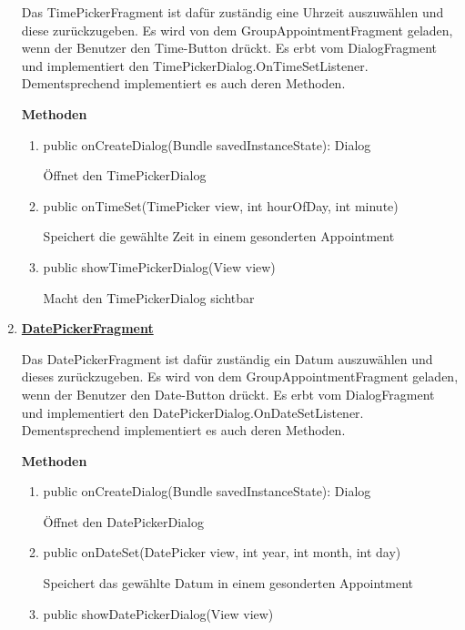 \begin{enumerate}
	Das TimePickerFragment ist dafür zuständig eine Uhrzeit auszuwählen und diese zurückzugeben. Es wird von dem GroupAppointmentFragment geladen, wenn der Benutzer den Time-Button drückt. Es erbt vom DialogFragment und implementiert den TimePickerDialog.OnTimeSetListener. Dementsprechend implementiert es auch deren Methoden.

	\textbf{Methoden}
	\begin{enumerate}
		\item public onCreateDialog(Bundle savedInstanceState): Dialog
	
		Öffnet den TimePickerDialog
		
		\item public onTimeSet(TimePicker view, int hourOfDay, int minute)
	
		Speichert die gewählte Zeit in einem gesonderten Appointment
		
		\item public showTimePickerDialog(View view)
		
		Macht den TimePickerDialog sichtbar
	\end{enumerate}
	\item \textbf{\underline{DatePickerFragment}}

	Das DatePickerFragment ist dafür zuständig ein Datum auszuwählen und dieses zurückzugeben. Es wird von dem GroupAppointmentFragment geladen, wenn der Benutzer den Date-Button drückt. Es erbt vom DialogFragment und implementiert den DatePickerDialog.OnDateSetListener. Dementsprechend implementiert es auch deren Methoden.

	\textbf{Methoden}
	\begin{enumerate}
		\item public onCreateDialog(Bundle savedInstanceState): Dialog

		Öffnet den DatePickerDialog

		\item public onDateSet(DatePicker view, int year, int month, int day)

		Speichert das gewählte Datum in einem gesonderten Appointment

		\item public showDatePickerDialog(View view)


\end{enumerate}
\end{enumerate}
